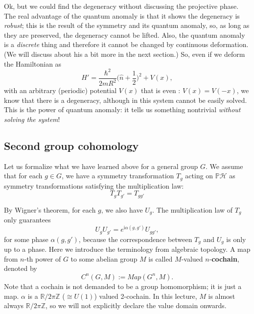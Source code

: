 \documentclass[
]{scrartcl}
\numberwithin{equation}{section}
\theoremstyle{definition}
\theoremstyle{definition}
\theoremstyle{definition}
\theoremstyle{definition}
\theoremstyle{remark}
\begin{document}
Ok, but we could find the degeneracy without discussing the projective phase. The real advantage of the quantum anomaly is that it shows the degeneracy is \emph{robust}; this is the result of the symmetry and its quantum anomaly, so, as long as they are preserved, the degeneracy cannot be lifted.
Also, the quantum anomaly is a \emph{discrete} thing and therefore it cannot be changed by continuous deformation. (We will discuss about his a bit more in the next section.)
So, even if we deform the Hamiltonian as
\begin{equation}
  \label{eq:ABringHamDef}
  H' = \frac{\hbar^2}{2mR^2}\bigl(\hat{n} + \frac{1}{2} \bigr)^2 + V(x),
\end{equation}
with an arbitrary (periodic) potential \(V(x)\) that is even : \(V(x) = V(-x)\),
we know that there is a degeneracy, although in this system cannot be easily solved.
This is the power of quantum anomaly: it tells us something nontrivial \emph{without solving the system}!

\hypertarget{second-group-cohomology}{%
\subsection{Second group cohomology}\label{second-group-cohomology}}

Let us formalize what we have learned above for a general group \(G\).
We assume that for each \(g\in G\), we have a symmetry transformation \(T_g\) acting on \(\mathbb{P}\mathcal{H}\) as symmetry transformations satisfying the multiplication law:
\begin{equation}
  \label{eq:Tmult}
  T_g T_{g'} = T_{gg'}
\end{equation}

By Wigner's theorem, for each \(g\), we also have \(U_g\).
The multiplication law of \(T_g\) only guarantees
\begin{equation}
  \label{eq:ProjRepGen}
  U_g U_{g'} = e^{\mathrm{i}\alpha(g,g')}U_{gg'},
\end{equation}
for some phase \(\alpha(g,g')\), because the correspondence between \(T_g\) and \(U_g\) is only up to a phase.
Here we introduce the terminology from algebraic topology.
A map from \(n\)-th power of \(G\) to some abelian group \(M\) is called \(M\)-valued \(n\)-\textbf{cochain}, denoted by
\begin{equation}
  \label{eq:GroupCochain}
  C^n(G,M) := Map(G^n,M).
\end{equation}
Note that a cochain is not demanded to be a group homomorphism; it is just a map.
\(\alpha\) is a \(\mathbb{R}/2\pi\mathbb{Z}\) (\(\cong U(1)\)) valued 2-cochain.
In this lecture, \(M\) is almost always \(\mathbb{R}/2\pi\mathbb{Z}\), so we will not explicitly declare the value domain onwards.
\end{document}
